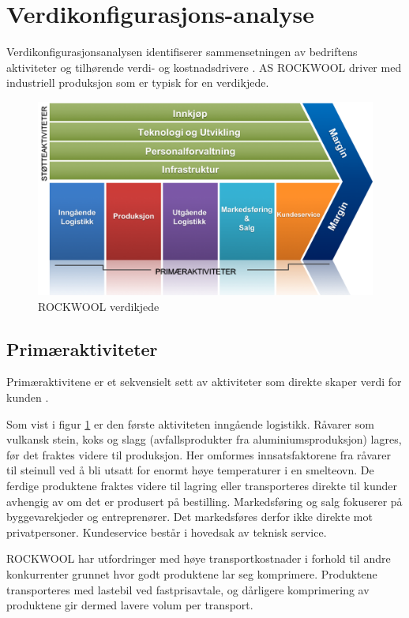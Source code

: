 \section{Verdikonfigurasjons-analyse}
Verdikonfigurasjonsanalysen identifiserer sammensetningen av bedriftens aktiviteter og tilhørende verdi- og kostnadsdrivere \cite[s.~32]{FjeldstadogLunnan2018}. AS ROCKWOOL driver med industriell produksjon som er typisk for en verdikjede.

\begin{figure}[H]
\centering
\includegraphics [scale=0.5]{bilder/verdikjede.png}
\caption{ROCKWOOL verdikjede}
\label{fig:verdikjede}
\end{figure}

\subsection{Primæraktiviteter}
Primæraktivitene er et sekvensielt sett av aktiviteter som direkte skaper verdi for kunden \cite[s.~132]{FjeldstadogLunnan2018}. 
 
\indent \newline
Som vist i figur \ref{fig:verdikjede} er den første aktiviteten inngående logistikk. Råvarer som vulkansk stein, koks og slagg (avfallsprodukter fra aluminiumsproduksjon) lagres, før det fraktes videre til produksjon. Her omformes innsatsfaktorene fra råvarer til steinull ved å bli utsatt for enormt høye temperaturer i en smelteovn. De ferdige produktene fraktes videre til lagring eller transporteres direkte til kunder avhengig av om det er produsert på bestilling. Markedsføring og salg fokuserer på byggevarekjeder og entreprenører. Det markedsføres derfor ikke direkte mot privatpersoner. Kundeservice består i hovedsak av teknisk service.

\indent \newline
ROCKWOOL har utfordringer med høye transportkostnader i forhold til andre konkurrenter grunnet hvor godt produktene lar seg komprimere. Produktene transporteres med lastebil ved fastprisavtale, og dårligere komprimering av produktene gir dermed lavere volum per transport. 

